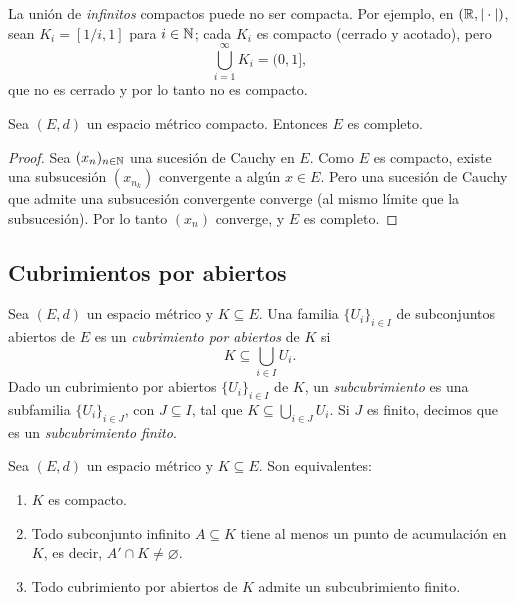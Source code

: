 \begin{obs}
La unión de \emph{infinitos} compactos puede no ser compacta. Por
ejemplo, en $(\mathbb{R},|\cdot|)$, sean $K_i=[1/i,1]$ para $i\in\mathbb{N}$; cada $K_i$
es compacto (cerrado y acotado), pero
\[
\bigcup_{i=1}^\infty K_i = (0,1],
\]
que no es cerrado y por lo tanto no es compacto.
\end{obs}

\begin{prop}
Sea $(E,d)$ un espacio métrico compacto. Entonces $E$ es completo.
\end{prop}

\begin{proof}
Sea $(x_n)_{n\in\mathbb{N}}$ una sucesión de Cauchy en $E$. Como $E$ es compacto,
existe una subsucesión $(x_{n_k})$ convergente a algún $x\in E$. Pero una
sucesión de Cauchy que admite una subsucesión convergente converge (al
mismo límite que la subsucesión). Por lo tanto $(x_n)$ converge, y $E$ es
completo.
\end{proof}

\subsection{Cubrimientos por abiertos}

\begin{defi}
Sea $(E,d)$ un espacio métrico y $K \subseteq E$. Una familia
$\{U_i\}_{i\in I}$ de subconjuntos abiertos de $E$ es un
\emph{cubrimiento por abiertos} de $K$ si
\[
K \subseteq \bigcup_{i \in I} U_i.
\]
Dado un cubrimiento por abiertos $\{U_i\}_{i\in I}$ de $K$, un
\emph{subcubrimiento} es una subfamilia $\{U_i\}_{i\in J}$, con
$J\subseteq I$, tal que $K\subseteq \bigcup_{i\in J} U_i$. Si $J$ es
finito, decimos que es un \emph{subcubrimiento finito}.
\end{defi}

\begin{teo}
Sea $(E,d)$ un espacio métrico y $K \subseteq E$. Son equivalentes:
\begin{enumerate}[label=(\roman*)]
    \item $K$ es compacto.
    \item Todo subconjunto infinito $A \subseteq K$ tiene al menos un
    punto de acumulación en $K$, es decir, $A' \cap K \neq \varnothing$.
    \item Todo cubrimiento por abiertos de $K$ admite un subcubrimiento
    finito.
\end{enumerate}
\end{teo}

